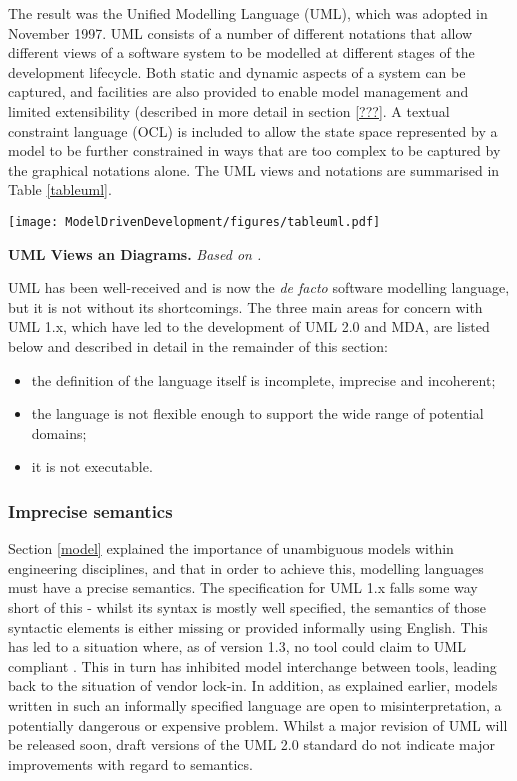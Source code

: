 The result was the Unified Modelling Language (UML)\cite{umlspec}, which was adopted in November 1997. UML consists of a number of different notations that allow different views of a software system to be modelled at different stages of the development lifecycle. Both static and dynamic aspects of a system can be captured, and facilities are also provided to enable model management and limited extensibility (described in more detail in section \ref{???}. A textual constraint language (OCL) is included to allow the state space represented by a model to be further constrained in ways that are too complex to be captured by the graphical notations alone. The UML views and notations are summarised in Table \ref{tableuml}.

\begin{table}[htb]
\begin{center}
\texttt{[image: ModelDrivenDevelopment/figures/tableuml.pdf]}
\caption{\textbf{UML Views an Diagrams.} \em{Based on \cite{umllrm}.}}
\label{tableuml}
\end{center}
\end{table}

UML has been well-received and is now the \emph{de facto} software modelling language, but it is not without its shortcomings. The three main areas for concern with UML 1.x, which have led to the development of UML 2.0 and MDA, are listed below and described in detail in the remainder of this section:
\begin{itemize}
\item the definition of the language itself is incomplete, imprecise and incoherent;
\item the language is not flexible enough to support the wide range of potential domains;
\item it is not executable.
\end{itemize}

\subsubsection*{Imprecise semantics}

Section \ref{model} explained the importance of unambiguous models within engineering disciplines, and that in order to achieve this, modelling languages must have a precise semantics. The specification for UML 1.x\cite{umlspec} falls some way short of this - whilst its syntax is mostly well specified, the semantics of those syntactic elements is either missing or provided informally using English. This has led to a situation where, as of version 1.3, no tool could claim to UML compliant \cite{pumlrfi}. This in turn has inhibited model interchange between tools, leading back to the situation of vendor lock-in. In addition, as explained earlier, models written in such an informally specified language are open to misinterpretation, a potentially dangerous or expensive problem. Whilst a major revision of UML will be released soon, draft versions of the UML 2.0 standard do not indicate major improvements with regard to semantics.

